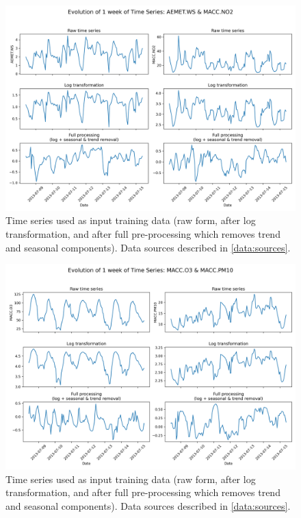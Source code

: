 \documentclass[12pt,a4paper]{book}
\begin{document}
\begin{figure}[h]
  \centering  
  \includegraphics[width=\textwidth]{time_series_page_3.png}
  \caption{Time series used as input training data (raw form, after log transformation, and after full pre-processing which removes trend and seasonal components). Data sources described in \ref{data:sources}.}
  \label{fig:evo_ts3}
\end{figure}

\begin{figure}[h]
  \centering  
  \includegraphics[width=\textwidth]{time_series_page_4.png}
  \caption{Time series used as input training data (raw form, after log transformation, and after full pre-processing which removes trend and seasonal components). Data sources described in \ref{data:sources}.}
  \label{fig:evo_ts4}
\end{figure}
\end{document}
